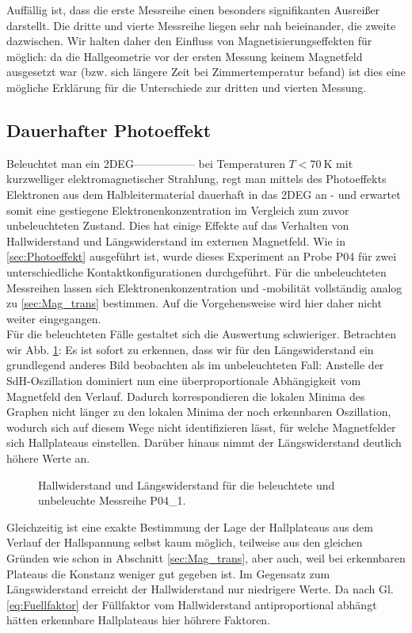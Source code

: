 Auffällig ist, dass die erste Messreihe einen besonders signifikanten Ausreißer darstellt. Die dritte und vierte Messreihe liegen sehr nah beieinander, die zweite dazwischen. Wir halten daher den Einfluss von Magnetisierungseffekten für möglich: da die Hallgeometrie vor der ersten Messung keinem Magnetfeld ausgesetzt war (bzw. sich längere Zeit bei Zimmertemperatur befand) ist dies eine mögliche Erklärung für die Unterschiede zur dritten und vierten Messung. 

\clearpage
\subsection{Dauerhafter Photoeffekt}\label{sec:Photo}

Beleuchtet man ein 2DEG----------------- bei Temperaturen $T < \SI{70}{\kelvin}$ mit kurzwelliger elektromagnetischer Strahlung, regt man mittels des Photoeffekts Elektronen aus dem Halbleitermaterial dauerhaft in das 2DEG an - und erwartet somit eine gestiegene Elektronenkonzentration im Vergleich zum zuvor unbeleuchteten Zustand. Dies hat einige Effekte auf das Verhalten von Hallwiderstand und Längswiderstand im externen Magnetfeld. Wie in \autoref{sec:Photoeffekt} ausgeführt ist, wurde dieses Experiment an  Probe P04 für zwei unterschiedliche Kontaktkonfigurationen durchgeführt. Für die unbeleuchteten Messreihen lassen sich Elektronenkonzentration und -mobilität vollständig analog zu \autoref{sec:Mag_trans} bestimmen. Auf die Vorgehensweise wird hier daher nicht weiter eingegangen. \\

Für die beleuchteten Fälle gestaltet sich die Auswertung schwieriger. Betrachten wir Abb. \ref{abb:P04_Compare}: Es ist sofort zu erkennen, dass wir für den Längswiderstand ein grundlegend anderes Bild beobachten als im unbeleuchteten Fall: Anstelle der SdH-Oszillation dominiert nun eine überproportionale Abhängigkeit vom Magnetfeld den Verlauf. Dadurch korrespondieren die lokalen Minima des Graphen nicht länger zu den lokalen Minima der noch erkennbaren Oszillation, wodurch sich auf diesem Wege nicht identifizieren lässt, für welche Magnetfelder sich Hallplateaus einstellen. Darüber hinaus nimmt der Längswiderstand deutlich höhere Werte an.

\begin{figure}[h!]
	\centering
	
	\caption{Hallwiderstand und Längswiderstand für die beleuchtete und unbeleuchte Messreihe P04\_1.}
	\label{abb:P04_Compare}
\end{figure}
Gleichzeitig ist eine exakte Bestimmung der Lage der Hallplateaus aus dem Verlauf der Hallspannung selbst kaum möglich, teilweise aus den gleichen Gründen wie schon in Abschnitt \ref{sec:Mag_trans}, aber auch, weil bei erkennbaren Plateaus die Konstanz weniger gut gegeben ist. Im Gegensatz zum Längswiderstand erreicht der Hallwiderstand nur niedrigere Werte. Da nach Gl. \ref{eq:Fuellfaktor} der Füllfaktor vom Hallwiderstand antiproportional abhängt hätten erkennbare Hallplateaus hier höhrere Faktoren. 
 
